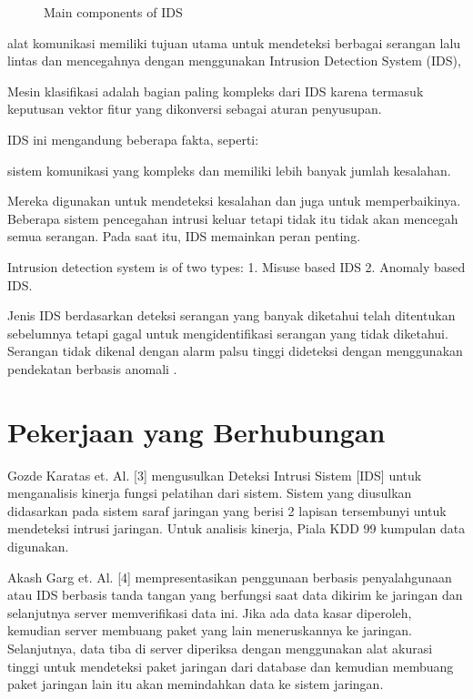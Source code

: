 \documentclass[conference]{IEEEtran}
\begin{document}
\begin{figure}[htbp]
    \centering
    \def\svgwidth{\columnwidth}
    \scalebox{0.9}{}
    \caption{Main components of IDS}
\end{figure}

    alat komunikasi memiliki tujuan utama untuk mendeteksi berbagai serangan lalu lintas dan mencegahnya dengan menggunakan Intrusion Detection System (IDS),
    
    Mesin klasifikasi adalah bagian paling kompleks dari IDS karena termasuk keputusan vektor fitur yang dikonversi sebagai aturan penyusupan.
    
     IDS ini mengandung beberapa fakta, seperti:
     
     sistem komunikasi yang kompleks dan memiliki lebih banyak jumlah kesalahan.
     
     Mereka digunakan untuk mendeteksi kesalahan dan juga untuk memperbaikinya. Beberapa sistem pencegahan intrusi keluar tetapi tidak itu tidak akan mencegah semua serangan. Pada saat itu, IDS memainkan peran penting.
     
     Intrusion detection system is of two types: 1. Misuse based IDS 2. Anomaly based IDS.
     
     Jenis IDS berdasarkan deteksi serangan yang banyak diketahui telah ditentukan sebelumnya tetapi gagal untuk mengidentifikasi serangan yang tidak diketahui. Serangan tidak dikenal dengan alarm palsu tinggi dideteksi dengan menggunakan pendekatan berbasis anomali \cite{aydin2009hybrid}.
     
\section{Pekerjaan yang Berhubungan}
    Gozde Karatas et. Al. [3] \cite {karatas2018neural} mengusulkan Deteksi Intrusi Sistem [IDS] untuk menganalisis kinerja fungsi pelatihan dari sistem. Sistem yang diusulkan didasarkan pada sistem saraf jaringan yang berisi 2 lapisan tersembunyi untuk mendeteksi intrusi jaringan. Untuk analisis kinerja, Piala KDD 99 kumpulan data digunakan.
    
    Akash Garg et. Al. [4] \cite {garg2016hybrid} mempresentasikan penggunaan berbasis penyalahgunaan atau IDS berbasis tanda tangan yang berfungsi saat data dikirim ke jaringan dan selanjutnya server memverifikasi data ini. Jika ada data kasar diperoleh, kemudian server membuang paket yang lain meneruskannya ke jaringan. Selanjutnya, data tiba di server diperiksa dengan menggunakan alat akurasi tinggi untuk mendeteksi paket jaringan dari database dan kemudian membuang paket jaringan lain itu akan memindahkan data ke sistem jaringan.
    
\end{document}
